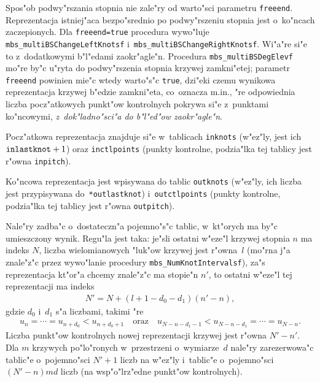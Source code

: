 Spos"ob podwy"rszania stopnia nie zale"ry od warto"sci parametru
\texttt{freeend}. Reprezentacja istniej"aca bezpo"srednio po
podwy"rszeniu stopnia jest o~ko"ncach zaczepionych. Dla
\texttt{freeend=true} procedura wywo"luje
\texttt{mbs\_multiBSChangeLeftKnotsf}
i~\texttt{mbs\_multiBSChangeRightKnotsf}. Wi"a"re si"e to z~dodatkowymi
b"l"edami zaokr"agle"n. Procedura \texttt{mbs\_multiBSDegElevf} mo"re by"c
u"ryta do podwy"rszenia stopnia krzywej zamkni"etej; parametr
\texttt{freeend} powinien mie"c wtedy warto"s"c \texttt{true}, dzi"eki czemu
wynikowa reprezentacja krzywej b"edzie zamkni"eta, co~oznacza m.in., "re
odpowiednia liczba pocz"atkowych punkt"ow kontrolnych pokrywa si"e
z~punktami ko"ncowymi, \emph{z~dok"ladno"sci"a do b"l"ed"ow zaokr"agle"n}.

Pocz"atkowa reprezentacja znajduje si"e w~tablicach \texttt{inknots}
(w"ez"ly, jest ich $\mathord{\mbox{\texttt{inlastknot}}}+1$) oraz
\texttt{inctlpoints} (punkty kontrolne, podzia"lka tej tablicy jest r"owna
\texttt{inpitch}).

Ko"ncowa reprezentacja jest wpisywana do tablic \texttt{outknots} (w"ez"ly,
ich liczba jest przypisywana do~\texttt{*outlastknot})
i~\texttt{outctlpoints} (punkty kontrolne, podzia"lka tej tablicy jest
r"owna \texttt{outpitch}).

Nale"ry zadba"c o~dostateczn"a pojemno"s"c tablic, w~kt"orych ma by"c
umieszczony wynik. Regu"la jest taka: je"sli ostatni w"eze"l krzywej stopnia
$n$ ma indeks $N$, liczba wielomianowych "luk"ow krzywej jest r"owna~$l$
(mo"rna j"a znale"z"c przez wywo"lanie procedury 
\texttt{mbs\_NumKnotIntervalsf}), za"s reprezentacja kt"or"a chcemy
znale"z"c ma stopie"n $n'$, to ostatni w"eze"l tej reprezentacji ma indeks
\begin{align*}
  N' = N+(l+1-d_0-d_1)(n'-n),
\end{align*}
gdzie $d_0$ i~$d_1$ s"a liczbami, takimi "re
\begin{align*}
  u_n=\cdots=u_{n+d_0}<u_{n+d_0+1}\quad\mbox{oraz}\quad
  u_{N-n-d_1-1}<u_{N-n-d_1}=\cdots=u_{N-n}.
\end{align*}
Liczba punkt"ow kontrolnych nowej reprezentacji krzywej jest r"owna $N'-n'$.
Dla $m$ krzywych
po"lo"ronych w~przestrzeni o~wymiarze~$d$ nale"ry zarezerwowa"c tablic"e
o~pojemno"sci $N'+1$ liczb na w"ez"ly i~tablic"e o~pojemno"sci $(N'-n)md$
liczb (na wsp"o"lrz"edne punkt"ow kontrolnych).

